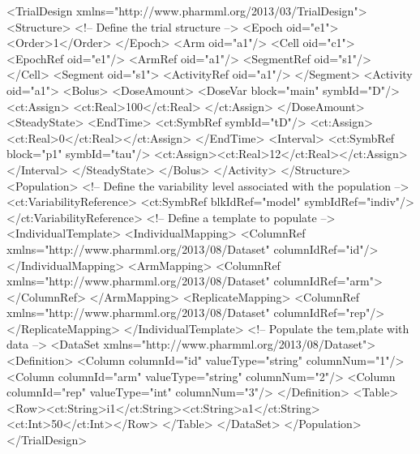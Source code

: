 \documentclass[a4paper,10pt]{article}
\begin{document}
\begin{xmlcode}
    <TrialDesign xmlns="http://www.pharmml.org/2013/03/TrialDesign">
        <Structure>
            <!-- Define the trial structure -->
            <Epoch oid="e1">
                <Order>1</Order>
            </Epoch>
            <Arm oid="a1"/>
            <Cell oid="c1">
                <EpochRef oid="e1"/>
                <ArmRef oid="a1"/>
                <SegmentRef oid="s1"/>
            </Cell>
            <Segment oid="s1">
                <ActivityRef oid="a1"/>
            </Segment>
            <Activity oid="a1">
                <Bolus>
                    <DoseAmount>
                        <DoseVar block="main" symbId="D"/>
                        <ct:Assign>
                            <ct:Real>100</ct:Real>
                        </ct:Assign>
                    </DoseAmount>
                    <SteadyState>
                        <EndTime>
                            <ct:SymbRef symbId="tD"/>
                            <ct:Assign><ct:Real>0</ct:Real></ct:Assign>
                        </EndTime>
                        <Interval>
                            <ct:SymbRef block="p1" symbId="tau"/>
                            <ct:Assign><ct:Real>12</ct:Real></ct:Assign>
                        </Interval>
                    </SteadyState>
                </Bolus>
            </Activity>
        </Structure>
        <Population>
            <!-- Define the variability level associated with the
                population -->
            <ct:VariabilityReference>
                <ct:SymbRef blkIdRef="model" symbIdRef="indiv"/>
            </ct:VariabilityReference>
            <!-- Define a template to populate -->
            <IndividualTemplate>
                <IndividualMapping>
                    <ColumnRef xmlns="http://www.pharmml.org/2013/08/Dataset" columnIdRef="id"/>
                </IndividualMapping>
                <ArmMapping>
                    <ColumnRef xmlns="http://www.pharmml.org/2013/08/Dataset" columnIdRef="arm"></ColumnRef>
                </ArmMapping>
                <ReplicateMapping>
                    <ColumnRef xmlns="http://www.pharmml.org/2013/08/Dataset" columnIdRef="rep"/>
                </ReplicateMapping>
            </IndividualTemplate>
            <!-- Populate the tem,plate with data -->
            <DataSet xmlns="http://www.pharmml.org/2013/08/Dataset">
                <Definition>
                    <Column columnId="id" valueType="string" columnNum="1"/>
                    <Column columnId="arm" valueType="string" columnNum="2"/>
                    <Column columnId="rep" valueType="int" columnNum="3"/>
                </Definition>
                <Table>
                    <Row><ct:String>i1</ct:String><ct:String>a1</ct:String><ct:Int>50</ct:Int></Row>
                </Table>
            </DataSet>
        </Population>
    </TrialDesign>
\end{xmlcode}
\end{document}
